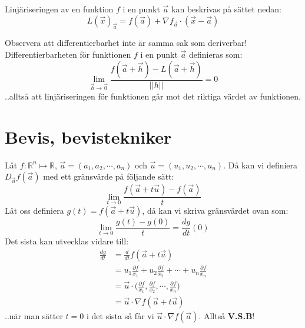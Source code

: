 \documentclass{report}
\begin{document}
{
Linjäriseringen av en funktion $f$ i en punkt $\vec{a}$ kan beskrivas på sättet nedan:
\begin{equation*}
	L(\vec{x})_{\vec{a}} = f(\vec{a}) + \nabla f_{\vec{a}} \cdot (\vec{x}-\vec{a})
\end{equation*}
}

{
Observera att differentierbarhet inte är samma sak som deriverbar! Differentierbarheten för funktionen $f$ i en punkt $\vec{a}$ definieras som:
\begin{equation*}
\lim_{\vec{h} \to \vec{0}} \frac{f(\vec{a}+\vec{h})-L(\vec{a}+\vec{h})}{||h||} = 0
\end{equation*}
..alltså att linjäriseringen för funktionen går mot det riktiga värdet av funktionen. 
}

\pagebreak

\chapter{Bevis, bevistekniker}
{
	Låt $f : \mathbb{R}^n \mapsto \mathbb{R}$, $\vec{a} = (a_1, a_2, \cdots, a_n)$ och $\vec{u} = (u_1, u_2, \cdots, u_n)$. Då kan vi definiera $D_{\vec{u}}f(\vec{a})$ med ett gränsvärde på följande sätt:
	\begin{equation*}
		\lim_{t \to 0} \frac{ f(\vec{a} + t\vec{u})-f(\vec{a})}{t}
	\end{equation*}
	Låt oss definiera $g(t) = f(\vec{a} + t\vec{u})$, då kan vi skriva gränsvärdet ovan som:
	\begin{equation*}
		\lim_{t \to 0} \frac{g(t)-g(0)}{t} = \frac{dg}{dt}(0)
	\end{equation*}
	Det sista kan utvecklas vidare till:
	\begin{align*}
		\frac{dg}{dt} &= \frac{d}{dt}f(\vec{a} + t\vec{u})\\
			      &= u_1 \frac{\partial f}{x_1} + u_2 \frac{\partial f}{x_2} + \cdots + u_n \frac{\partial f}{x_n}\\
			      &= \vec{u} \cdot \bigl( \frac{\partial f}{x_1}, \frac{\partial f}{x_2}, \cdots, \frac{\partial f}{x_n} \bigr)\\
			      &= \vec{u} \cdot \nabla f(\vec{a} + t\vec{u})
	\end{align*}
	..när man sätter $ t = 0$ i det sista så får vi $\vec{u} \cdot \nabla f(\vec{a})$. Alltså \textbf{V.S.B}!
}
\end{document}

